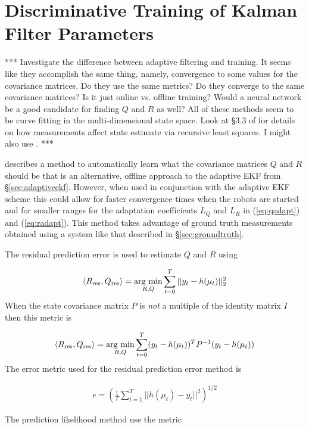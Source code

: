 \section{Discriminative Training of Kalman Filter Parameters}
\label{sec:trainingkfparams}
*** Investigate the difference between adaptive filtering and training. It seems like they accomplish the same thing, namely, convergence to some values for the covariance matrices. Do they use the same metrics? Do they converge to the same covariance matrices? Is it just online vs. offline training? Would a neural network be a good candidate for finding $Q$ and $R$ as well? All of these methods seem to be curve fitting in the multi-dimensional state space. Look at \S3.3 of \cite{Simon06OptimalEstimation} for details on how measurements affect state estimate via recursive least squares. I might also use \cite{Orderud05}. ***

\cite{Abbeel-RSS-05} describes a method to automatically learn what the covariance matrices $Q$ and $R$ should be that is an alternative, offline approach to the adaptive EKF from \S\ref{sec:adaptiveekf}. However, when used in conjunction with the adaptive EKF scheme this could allow for faster convergence times when the robots are started and for smaller ranges for the adaptation coefficients $L_Q$ and $L_R$ in (\ref{eq:qadapt}) and (\ref{eq:radapt}). This method takes advantage of ground truth measurements obtained using a system like that described in \S\ref{sec:groundtruth}.

The residual prediction error is used to estimate $Q$ and $R$ using

\begin{align*}
\left<R_{\text{res}},Q_{\text{res}}\right> = \mathop{\arg\,\min}\limits_{R,Q}\sum_{t=0}^T ||y_t-h(\mu_t)||_2^2
\end{align*}
When the state covariance matrix $P$ is \textit{not} a multiple of the identity matrix $I$ then this metric is

\begin{align*}
\left<R_{\text{res}},Q_{\text{res}}\right> = \mathop{\arg\,\min}\limits_{R,Q}\sum_{t=0}^T (y_t-h(\mu_t))^TP^{-1}(y_t-h(\mu_t))
\end{align*}
The error metric used for the residual prediction error method is

\begin{align}
\label{eq:kftrainingres}
e = \left(\frac{1}{T}\sum_{t=1}^T ||h(\mu_t)-y_t||^2\right)^{1/2}
\end{align}

The prediction likelihood method use the metric

